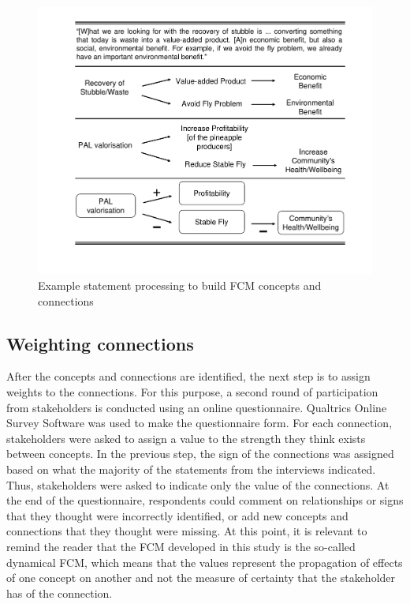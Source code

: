 \begin{figure}[H]
\caption[Example of interview statement processing]{Example statement processing to build FCM concepts and connections}
\label{process_fcm}
\centering
\includegraphics[width=\textwidth]{fig/processFCM.pdf}
\end{figure}


\subsection{Weighting connections}

After the concepts and connections are identified, the next step is to assign weights to the connections. For this purpose, a second round of participation from stakeholders is conducted using an online questionnaire. Qualtrics Online Survey Software was used to make the questionnaire form. For each connection, stakeholders were asked to assign a value to the strength they think exists between concepts. In the previous step, the sign of the connections was assigned based on what the majority of the statements from the interviews indicated. Thus, stakeholders were asked to indicate only the value of the connections. At the end of the questionnaire, respondents could comment on relationships or signs that they thought were incorrectly identified, or add new concepts and connections that they thought were missing. At this point, it is relevant to remind the reader that the FCM developed in this study is the so-called dynamical FCM, which means that the values represent the propagation of effects of one concept on another and not the measure of certainty that the stakeholder has of the connection. 

